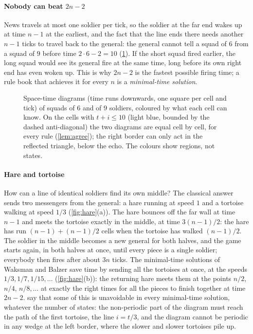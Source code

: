 \paragraph{Nobody can beat $2n-2$}
News travels at most one soldier per tick, so the soldier at the far end
wakes up at time $n-1$ at the earliest, and the fact that the line ends
there needs another $n-1$ ticks to travel back to the general: the general
cannot tell a squad of $6$ from a squad of $9$ before time $2\cdot6-2=10$
(\cref{fig:echo}). If the short squad fired earlier, the long squad would
see its general fire at the same time, long before its own right end has
even woken up. This is why $2n-2$ is the fastest possible firing time; a
rule book that achieves it for every $n$ is a \emph{minimal-time
solution}.

\begin{figure}[htbp]
\centering

\caption{Space-time diagrams (time runs downwards, one square per cell and
tick) of squads of $6$ and of $9$ soldiers, coloured by what each cell can
know. On the cells with $t+i\le10$ (light blue, bounded by the dashed
anti-diagonal) the two diagrams are equal cell by cell, for every rule
(\cref{lem:agree}); the right border can only
act in the reflected triangle, below the echo. The colours show regions,
not states.}
\label{fig:echo}
\end{figure}

\paragraph{Hare and tortoise}
How can a line of identical soldiers find its own middle? The classical
answer \cite{Minsky67} sends two messengers from the general: a hare
running at speed $1$ and a tortoise walking at speed $1/3$
(\cref{fig:hare}(a)). The hare bounces off the far wall at time $n-1$ and
meets the tortoise exactly in the middle, at time $3(n-1)/2$: the hare
has run $(n-1)+(n-1)/2$ cells when the tortoise has walked $(n-1)/2$. The
soldier in the middle becomes a new general for both halves, and the game
starts again, in both halves at once, until every piece is a single
soldier; everybody then fires after about $3n$ ticks. The minimal-time
solutions of Waksman and Balzer \cite{Waksman66,Balzer67} save time by
sending all the tortoises at once, at the speeds $1/3,1/7,1/15,\dots$
(\cref{fig:hare}(b)): the returning hare meets them at the points $n/2$,
$n/4$, $n/8,\dots$ at exactly the right times for all the pieces to finish
together at time $2n-2$.  say that some of this
is unavoidable in every minimal-time solution, whatever the number of
states: the non-periodic part of the diagram must reach the path of the
first tortoise, the line $i=t/3$, and the diagram cannot be periodic in any
wedge at the left border, where the slower and slower tortoises pile up.

